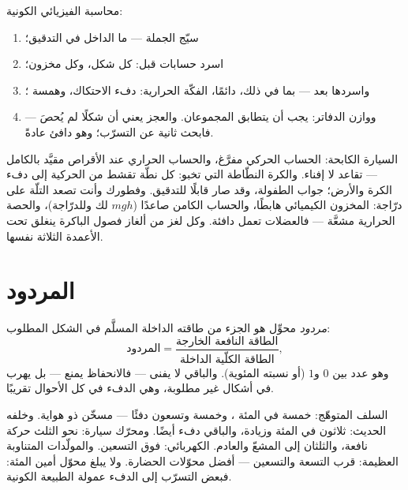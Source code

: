 \begin{method}\label{met:g9:energy-conversions:audit}
محاسبة الفيزيائي الكونية:
\begin{enumerate}
  \item سيّج الجملة --- ما الداخل في التدقيق؛
  \item اسرد حسابات  قبل: كل شكل، وكل مخزون؛
  \item واسردها بعد --- بما في ذلك، دائمًا، الفكّة الحرارية:
        دفء الاحتكاك، وهمسة ؛
  \item ووازن الدفاتر: يجب أن يتطابق المجموعان. والعجز يعني
        أن شكلًا لم يُحصَ --- فابحث ثانية عن التسرّب؛ وهو
        دافئ عادةً.
\end{enumerate}
\end{method}

\begin{example}\label{ex:g9:energy-conversions:audits}
السيارة الكابحة: الحساب الحركي مفرَّغ، والحساب الحراري عند
الأقراص مقيَّد بالكامل --- تقاعد لا إفناء. والكرة النطّاطة التي
تخبو: كل نطّة تقشط من الحركية إلى دفء الكرة والأرض؛ جواب
الطفولة، وقد صار قابلًا للتدقيق. وفطورك وأنت تصعد التلّة على
درّاجة: المخزون الكيميائي هابطًا، والحساب الكامن صاعدًا ($m g h$
لك وللدرّاجة)، والحصة الحرارية مشعَّة --- فالعضلات تعمل دافئة.
وكل لغز من ألغاز فصول  الباكرة ينغلق تحت الأعمدة الثلاثة
نفسها.
\end{example}

\section{المردود}

\begin{definition}[المردود]\label{def:g9:energy-conversions:efficiency}
\emph{مردود} محوِّل هو الجزء من طاقته الداخلة
المسلَّم في الشكل المطلوب:
\[
\text{المردود} =
\frac{\text{الطاقة النافعة الخارجة}}{\text{الطاقة الكلّية الداخلة}},
\]
وهو عدد بين $0$ و$1$ (أو نسبته المئوية). والباقي لا يفنى ---
فالانحفاظ يمنع --- بل يهرب في أشكال غير مطلوبة، وهي الدفء في
كل الأحوال تقريبًا.
\end{definition}

\begin{example}\label{ex:g9:energy-conversions:reportcards}
 السلف المتوهّج: خمسة في المئة ، وخمسة وتسعون
دفئًا --- مسخّن ذو هواية. وخلفه الحديث: ثلاثون في المئة وزيادة،
والباقي دفء أيضًا. ومحرّك سيارة: نحو الثلث حركة نافعة، والثلثان
إلى المشعّ والعادم.  الكهربائي: فوق التسعين. والمولّدات
المتناوبة العظيمة: قرب التسعة والتسعين --- أفضل محوّلات
الحضارة. ولا يبلغ محوّل أمين المئة: فبعض التسرّب إلى الدفء
عمولة الطبيعة الكونية.
\end{example}

